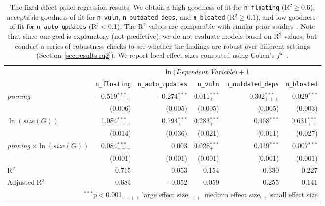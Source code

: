 \begin{table}
\footnotesize
\centering 
\caption{The fixed-effect panel regression results. 
We obtain a high goodness-of-fit for \texttt{n\_floating} (R$^{2}$$\ge$0.6), acceptable goodness-of-fit for \texttt{n\_vuln}, \texttt{n\_outdated\_deps}, and \texttt{n\_bloated} (R$^{2}$$\ge$0.1), and low goodness-of-fit for \texttt{n\_auto\_updates} (R$^{2}$$<$0.1).
The R$^{2}$ values are comparable with similar prior studies~\cite[see, e.g.,][]{DBLP:conf/sigsoft/ValievVH18, DBLP:conf/icse/ZahanSHW23}. 
Note that since our goal is explanatory (not predictive), we do not evaluate models based on R$^{2}$ values, but conduct a series of robustness checks to see whether the findings are robust over different settings (Section~\ref{sec:results-rq2}).
We report local effect sizes computed using Cohen's $f^2$~\cite{selya2012practical}.
}
\label{tab:pinning-regression} 
\begin{tabular}{lrrrrr} 
  \toprule
   & \multicolumn{5}{c}{$\ln($\emph{Dependent Variable}$) + 1$} \\ 
   & \texttt{n\_floating} & \texttt{n\_auto\_updates} & \texttt{n\_vuln} & \texttt{n\_outdated\_deps} & \texttt{n\_bloated}\\
  \midrule
  \emph{pinning} & $-$0.519$^{***}_{+++}$ & $-$0.274$^{***}_{+}$ & 0.011$^{***}_{+}$ & 0.302$^{***}_{+++}$ & 0.029$^{***}_{+}$\\ 
   & (0.006) & (0.005) & (0.005) & (0.005) & (0.003)\\ \addlinespace
  $\ln(size(G))$ & 1.084$^{***}_{+++}$ & 0.794$^{***}_{+}$ & 0.283$^{***}_{+}$ & 0.068$^{***}$ & 0.631$^{***}_{++}$ \\ 
   & (0.014) & (0.036) & (0.021) & (0.011) & (0.027)\\\addlinespace 
  \emph{pinning} $\times \ln(size(G))$ & 0.084$^{***}_{+++}$ & 0.003 & 0.028$^{***}_{+}$ & 0.019$^{***}$ & 0.007$^{***}$\\
  & (0.001) & (0.001) & (0.001) & (0.001) & (0.001) \\
 \midrule
 R$^{2}$ & 0.715 & 0.053 & 0.154 & 0.330 & 0.227 \\ 
 Adjusted R$^{2}$ & 0.684 & $-$0.052 & 0.059 & 0.255 & 0.141\\ 
 \bottomrule
 \multicolumn{6}{r}{$^{***}$p$<$0.001, $_{+++}$ large effect size, $_{++}$ medium effect size,   $_{+}$ small effect size} \\ 
\end{tabular} 
\end{table} 

